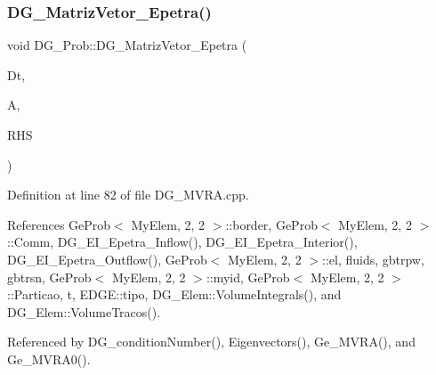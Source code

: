 \subsubsection{\texorpdfstring{D\+G\+\_\+\+Matriz\+Vetor\+\_\+\+Epetra()}{DG\_MatrizVetor\_Epetra()}}
{\footnotesize\ttfamily void D\+G\+\_\+\+Prob\+::\+D\+G\+\_\+\+Matriz\+Vetor\+\_\+\+Epetra (\begin{DoxyParamCaption}\item[{const double}]{Dt,  }\item[{Teuchos\+::\+R\+CP$<$ Epetra\+\_\+\+F\+E\+Crs\+Matrix $>$}]{A,  }\item[{Teuchos\+::\+R\+CP$<$ Epetra\+\_\+\+F\+E\+Vector $>$}]{R\+HS }\end{DoxyParamCaption})}



Definition at line 82 of file D\+G\+\_\+\+M\+V\+R\+A.\+cpp.



References Ge\+Prob$<$ My\+Elem, 2, 2 $>$\+::border, Ge\+Prob$<$ My\+Elem, 2, 2 $>$\+::\+Comm, D\+G\+\_\+\+E\+I\+\_\+\+Epetra\+\_\+\+Inflow(), D\+G\+\_\+\+E\+I\+\_\+\+Epetra\+\_\+\+Interior(), D\+G\+\_\+\+E\+I\+\_\+\+Epetra\+\_\+\+Outflow(), Ge\+Prob$<$ My\+Elem, 2, 2 $>$\+::el, fluids, gbtrpw, gbtrsn, Ge\+Prob$<$ My\+Elem, 2, 2 $>$\+::myid, Ge\+Prob$<$ My\+Elem, 2, 2 $>$\+::\+Particao, t, E\+D\+G\+E\+::tipo, D\+G\+\_\+\+Elem\+::\+Volume\+Integrals(), and D\+G\+\_\+\+Elem\+::\+Volume\+Tracos().



Referenced by D\+G\+\_\+condition\+Number(), Eigenvectors(), Ge\+\_\+\+M\+V\+R\+A(), and Ge\+\_\+\+M\+V\+R\+A0().

